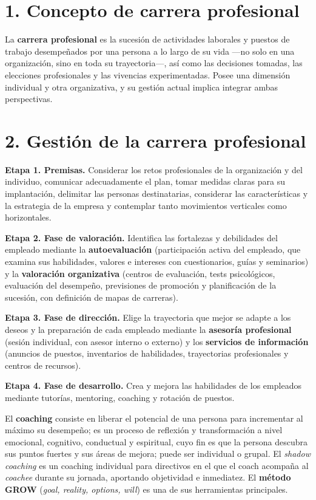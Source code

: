 \documentclass[12pt]{book} %
\begin{document}
\hypertarget{concepto-de-carrera-profesional}{%
\section{1. Concepto de carrera
profesional}\label{concepto-de-carrera-profesional}}

La \textbf{carrera profesional} es la sucesión de actividades laborales
y puestos de trabajo desempeñados por una persona a lo largo de su vida
---no solo en una organización, sino en toda su trayectoria---, así como
las decisiones tomadas, las elecciones profesionales y las vivencias
experimentadas. Posee una dimensión individual y otra organizativa, y su
gestión actual implica integrar ambas perspectivas.

\hypertarget{gestiuxf3n-de-la-carrera-profesional}{%
\section{2. Gestión de la carrera
profesional}\label{gestiuxf3n-de-la-carrera-profesional}}

\textbf{Etapa 1. Premisas.} Considerar los retos profesionales de la
organización y del individuo, comunicar adecuadamente el plan, tomar
medidas claras para su implantación, delimitar las personas
destinatarias, considerar las características y la estrategia de la
empresa y contemplar tanto movimientos verticales como horizontales.

\textbf{Etapa 2. Fase de valoración.} Identifica las fortalezas y
debilidades del empleado mediante la \textbf{autoevaluación}
(participación activa del empleado, que examina sus habilidades, valores
e intereses con cuestionarios, guías y seminarios) y la
\textbf{valoración organizativa} (centros de evaluación, tests
psicológicos, evaluación del desempeño, previsiones de promoción y
planificación de la sucesión, con definición de mapas de carreras).

\textbf{Etapa 3. Fase de dirección.} Elige la trayectoria que mejor se
adapte a los deseos y la preparación de cada empleado mediante la
\textbf{asesoría profesional} (sesión individual, con asesor interno o
externo) y los \textbf{servicios de información} (anuncios de puestos,
inventarios de habilidades, trayectorias profesionales y centros de
recursos).

\textbf{Etapa 4. Fase de desarrollo.} Crea y mejora las habilidades de
los empleados mediante tutorías, mentoring, coaching y rotación de
puestos.

El \textbf{coaching} consiste en liberar el potencial de una persona
para incrementar al máximo su desempeño; es un proceso de reflexión y
transformación a nivel emocional, cognitivo, conductual y espiritual,
cuyo fin es que la persona descubra sus puntos fuertes y sus áreas de
mejora; puede ser individual o grupal. El \emph{shadow coaching} es un
coaching individual para directivos en el que el coach acompaña al
\emph{coachee} durante su jornada, aportando objetividad e inmediatez.
El \textbf{método GROW} (\emph{goal, reality, options, will}) es una de
sus herramientas principales.
\end{document}
